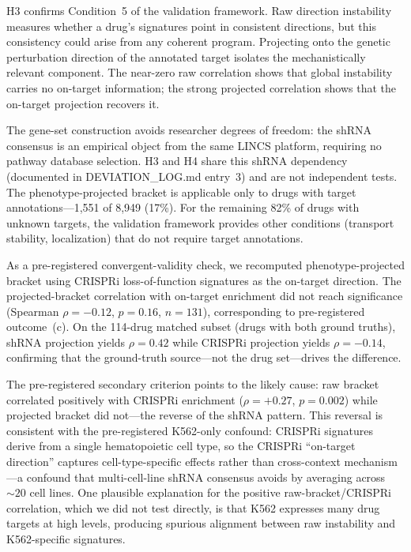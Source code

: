 \documentclass[11pt]{article}
\begin{document}
H3 confirms Condition~5 of the validation framework. Raw direction instability
measures whether a drug's signatures point in consistent directions, but
this consistency could arise from any coherent program. Projecting onto the
genetic perturbation direction of the annotated target isolates the
mechanistically relevant component. The near-zero raw correlation shows
that global instability carries no on-target information; the strong
projected correlation shows that the on-target projection recovers it.

The gene-set construction avoids researcher degrees of freedom: the shRNA
consensus is an empirical object from the same LINCS platform,
requiring no pathway database selection. H3 and H4 share this shRNA
dependency (documented in DEVIATION\_LOG.md entry~3) and are not
independent tests. The phenotype-projected bracket is applicable only
to drugs with target annotations---1{,}551 of 8{,}949 (17\%). For the
remaining 82\% of drugs with unknown targets, the validation framework
provides other conditions (transport stability, localization) that do not
require target annotations.

As a pre-registered convergent-validity check, we recomputed
phenotype-projected bracket using CRISPRi loss-of-function signatures
\citep{replogle2022mapping} as the on-target
direction. The projected-bracket correlation with on-target enrichment
did not reach significance (Spearman $\rho = -0.12$, $p = 0.16$,
$n = 131$), corresponding to pre-registered outcome~(c). On the
114-drug matched subset (drugs with both ground truths), shRNA
projection yields $\rho = 0.42$ while CRISPRi projection yields
$\rho = -0.14$, confirming that the ground-truth source---not the
drug set---drives the difference.

The pre-registered secondary criterion points to the likely cause: raw
bracket correlated positively with CRISPRi enrichment
($\rho = +0.27$, $p = 0.002$) while projected bracket did not---the
reverse of the shRNA pattern. This reversal is consistent with the
pre-registered K562-only confound: CRISPRi signatures derive from a
single hematopoietic cell type, so the CRISPRi ``on-target direction''
captures cell-type-specific effects rather than cross-context
mechanism---a confound that multi-cell-line shRNA consensus avoids by
averaging across ${\sim}20$ cell lines. One plausible explanation for
the positive raw-bracket/CRISPRi correlation, which we did not test
directly, is that K562 expresses many drug targets at high levels,
producing spurious alignment between raw instability and K562-specific
signatures.
\end{document}
